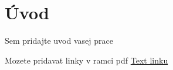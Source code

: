 \chapter*{Úvod}\label{chap:intro}

\pagestyle{plain}


Sem pridajte uvod vasej prace

Mozete pridavat linky v ramci pdf \hyperref[chap:prva]{Text linku} 
